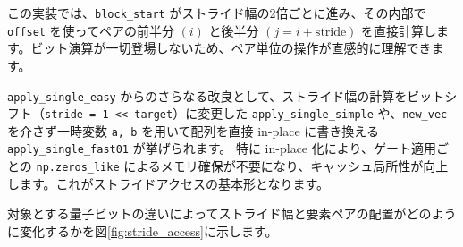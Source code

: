 この実装では、\texttt{block\_start} がストライド幅の2倍ごとに進み、その内部で \texttt{offset} を使ってペアの前半分 $(i)$ と後半分 $(j = i + \text{stride})$ を直接計算します。ビット演算が一切登場しないため、ペア単位の操作が直感的に理解できます。

\texttt{apply\_single\_easy} からのさらなる改良として、ストライド幅の計算をビットシフト（\texttt{stride = 1 << target}）に変更した \texttt{apply\_single\_simple} や、\texttt{new\_vec} を介さず一時変数 \texttt{a, b} を用いて配列を直接 in-place に書き換える \texttt{apply\_single\_fast01} が挙げられます。
特に in-place 化により、ゲート適用ごとの \texttt{np.zeros\_like} によるメモリ確保が不要になり、キャッシュ局所性が向上します。これがストライドアクセスの基本形となります。

対象とする量子ビットの違いによってストライド幅と要素ペアの配置がどのように変化するかを図\ref{fig:stride_access}に示します。

